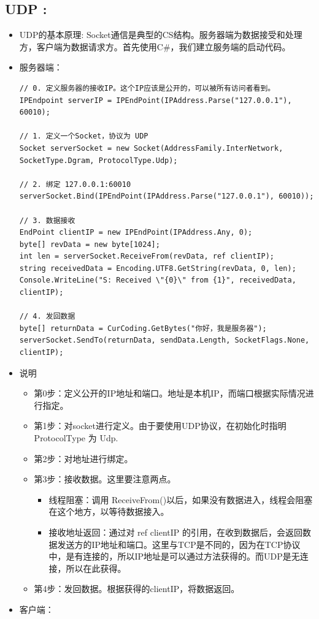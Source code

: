 \documentclass[9pt, b5paper]{article}
\begin{document}
\subsection{UDP :}
\label{sec-4-2}
\begin{itemize}
\item UDP的基本原理: Socket通信是典型的CS结构。服务器端为数据接受和处理方，客户端为数据请求方。首先使用C\#，我们建立服务端的启动代码。
\item 服务器端： 
\begin{verbatim}
// 0. 定义服务器的接收IP。这个IP应该是公开的，可以被所有访问者看到。
IPEndpoint serverIP = IPEndPoint(IPAddress.Parse("127.0.0.1"), 60010);

// 1. 定义一个Socket，协议为 UDP
Socket serverSocket = new Socket(AddressFamily.InterNetwork, SocketType.Dgram, ProtocolType.Udp);

// 2. 绑定 127.0.0.1:60010
serverSocket.Bind(IPEndPoint(IPAddress.Parse("127.0.0.1"), 60010));

// 3. 数据接收
EndPoint clientIP = new IPEndPoint(IPAddress.Any, 0);
byte[] revData = new byte[1024]; 
int len = serverSocket.ReceiveFrom(revData, ref clientIP);
string receivedData = Encoding.UTF8.GetString(revData, 0, len);
Console.WriteLine("S: Received \"{0}\" from {1}", receivedData, clientIP);

// 4. 发回数据
byte[] returnData = CurCoding.GetBytes("你好，我是服务器");
serverSocket.SendTo(returnData, sendData.Length, SocketFlags.None, clientIP);
\end{verbatim}
\item 说明
\begin{itemize}
\item 第0步：定义公开的IP地址和端口。地址是本机IP，而端口根据实际情况进行指定。
\item 第1步：对socket进行定义。由于要使用UDP协议，在初始化时指明 ProtocolType 为 Udp.
\item 第2步：对地址进行绑定。
\item 第3步：接收数据。这里要注意两点。
\begin{itemize}
\item 线程阻塞：调用 ReceiveFrom()以后，如果没有数据进入，线程会阻塞在这个地方，以等待数据接入。
\item 接收地址返回：通过对 ref clientIP 的引用，在收到数据后，会返回数据发送方的IP地址和端口。这里与TCP是不同的，因为在TCP协议中，是有连接的，所以IP地址是可以通过方法获得的。而UDP是无连接，所以在此获得。
\end{itemize}
\item 第4步：发回数据。根据获得的clientIP，将数据返回。
\end{itemize}
\item 客户端：
\end{itemize}
\end{document}
